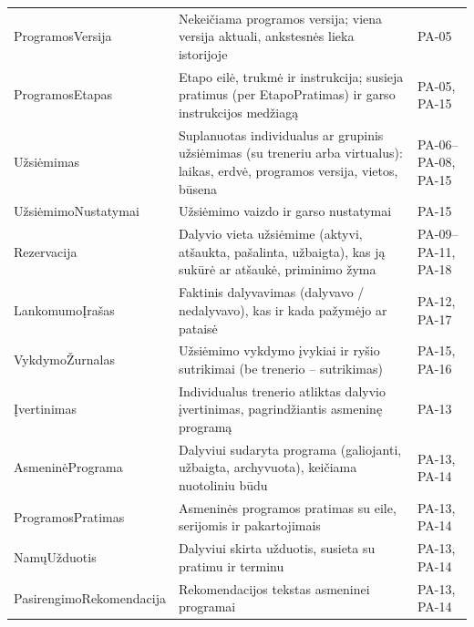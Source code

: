 \begin{longtable}{@{}p{}p{}p{}@{}}
ProgramosVersija & Nekeičiama programos versija; viena versija aktuali, ankstesnės lieka istorijoje & PA-05 \\
ProgramosEtapas & Etapo eilė, trukmė ir instrukcija; susieja pratimus (per EtapoPratimas) ir garso instrukcijos medžiagą & PA-05, PA-15 \\
Užsiėmimas & Suplanuotas individualus ar grupinis užsiėmimas (su treneriu arba virtualus): laikas, erdvė, programos versija, vietos, būsena & PA-06--PA-08, PA-15 \\
UžsiėmimoNustatymai & Užsiėmimo vaizdo ir garso nustatymai & PA-15 \\
Rezervacija & Dalyvio vieta užsiėmime (aktyvi, atšaukta, pašalinta, užbaigta), kas ją sukūrė ar atšaukė, priminimo žyma & PA-09--PA-11, PA-18 \\
LankomumoĮrašas & Faktinis dalyvavimas (dalyvavo / nedalyvavo), kas ir kada pažymėjo ar pataisė & PA-12, PA-17 \\
VykdymoŽurnalas & Užsiėmimo vykdymo įvykiai ir ryšio sutrikimai (be trenerio -- sutrikimas) & PA-15, PA-16 \\
Įvertinimas & Individualus trenerio atliktas dalyvio įvertinimas, pagrindžiantis asmeninę programą & PA-13 \\
AsmeninėPrograma & Dalyviui sudaryta programa (galiojanti, užbaigta, archyvuota), keičiama nuotoliniu būdu & PA-13, PA-14 \\
ProgramosPratimas & Asmeninės programos pratimas su eile, serijomis ir pakartojimais & PA-13, PA-14 \\
NamųUžduotis & Dalyviui skirta užduotis, susieta su pratimu ir terminu & PA-13, PA-14 \\
PasirengimoRekomendacija & Rekomendacijos tekstas asmeninei programai & PA-13, PA-14 \\
\end{longtable}
